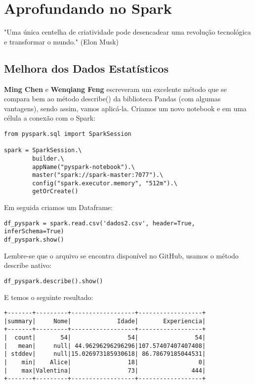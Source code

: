 \chapter{Aprofundando no Spark}

\begin{remark}
"Uma única centelha de criatividade pode desencadear uma revolução tecnológica e transformar o mundo." (Elon Musk) 
\end{remark}

\section{Melhora dos Dados Estatísticos}
\textbf{Ming Chen} e \textbf{Wenqiang Feng} escreveram um excelente método que se compara bem ao método describe() da biblioteca Pandas (com algumas vantagens), sendo assim, vamos aplicá-la. Criamos um novo notebook e em uma célula a conexão com o Spark:
\begin{lstlisting}[]
from pyspark.sql import SparkSession

spark = SparkSession.\
        builder.\
        appName("pyspark-notebook").\
        master("spark://spark-master:7077").\
        config("spark.executor.memory", "512m").\
        getOrCreate()
\end{lstlisting}

Em seguida criamos um Dataframe:
\begin{lstlisting}[]
df_pyspark = spark.read.csv('dados2.csv', header=True, inferSchema=True)
df_pyspark.show()
\end{lstlisting}

Lembre-se que o arquivo se encontra disponível no GitHub, usamos o método describe nativo:
\begin{lstlisting}[]
df_pyspark.describe().show()
\end{lstlisting}

E temos o seguinte resultado:
 \vspace{-1.5em}
\begin{verbatim}
+-------+---------+------------------+------------------+
|summary|     Nome|             Idade|       Experiencia|
+-------+---------+------------------+------------------+
|  count|       54|                54|                54|
|   mean|     null| 44.96296296296296|107.57407407407408|
| stddev|     null|15.026973185930618| 86.78679185044531|
|    min|    Alice|                18|                 0|
|    max|Valentina|                73|               444|
+-------+---------+------------------+------------------+
\end{verbatim}

